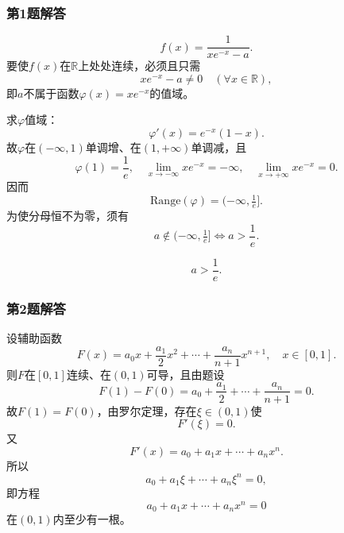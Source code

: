 \documentclass[./book.tex]{subfiles}
\begin{document}
    \subsubsection*{第1题解答}
    \begin{analysisbox}
        \[
            f(x)=\frac{1}{xe^{-x}-a}.
        \]
        要使$f(x)$在$\mathbb R$上处处连续，必须且只需
        \[
            xe^{-x}-a\neq 0\quad(\forall x\in\mathbb R),
        \]
        即$a$不属于函数$\varphi(x)=xe^{-x}$的值域。

        求$\varphi$值域：
        \[
            \varphi'(x)=e^{-x}(1-x).
        \]
        故$\varphi$在$(-\infty,1)$单调增、在$(1,+\infty)$单调减，且
        \[
            \varphi(1)=\frac1e,\quad
            \lim_{x\to-\infty}xe^{-x}=-\infty,\quad
            \lim_{x\to+\infty}xe^{-x}=0.
        \]
        因而
        \[
            \mathrm{Range}(\varphi)=(-\infty,\tfrac1e].
        \]
        为使分母恒不为零，须有
        \[
            a\notin(-\infty,\tfrac1e]\Longleftrightarrow a>\frac1e.
        \]

        \[
            \boxed{a>\frac1e}.
        \]
    \end{analysisbox}

    \subsubsection*{第2题解答}
    \begin{analysisbox}
        设辅助函数
        \[
            F(x)=a_0x+\frac{a_1}{2}x^2+\cdots+\frac{a_n}{n+1}x^{n+1},\quad x\in[0,1].
        \]
        则$F$在$[0,1]$连续、在$(0,1)$可导，且由题设
        \[
            F(1)-F(0)=a_0+\frac{a_1}{2}+\cdots+\frac{a_n}{n+1}=0.
        \]
        故$F(1)=F(0)$，由罗尔定理，存在$\xi\in(0,1)$使
        \[
            F'(\xi)=0.
        \]
        又
        \[
            F'(x)=a_0+a_1x+\cdots+a_nx^n.
        \]
        所以
        \[
            a_0+a_1\xi+\cdots+a_n\xi^n=0,
        \]
        即方程
        \[
            a_0+a_1x+\cdots+a_nx^n=0
        \]
        在$(0,1)$内至少有一根。
    \end{analysisbox}
\end{document}
